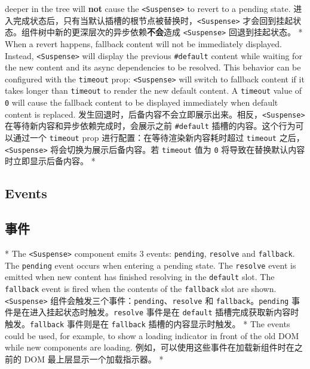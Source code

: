 \begin{paracol}{2}
deeper in the tree will \textbf{not} cause the
\texttt{\textless{}Suspense\textgreater{}} to revert to a pending state.
\switchcolumn
进入完成状态后，只有当默认插槽的根节点被替换时，\texttt{\textless{}Suspense\textgreater{}}
才会回到挂起状态。组件树中新的更深层次的异步依赖\textbf{不会}造成
\texttt{\textless{}Suspense\textgreater{}} 回退到挂起状态。
\switchcolumn[0]*%
When a revert happens, fallback content will not be immediately
displayed. Instead, \texttt{\textless{}Suspense\textgreater{}} will
display the previous \texttt{\#default} content while waiting for the
new content and its async dependencies to be resolved. This behavior can
be configured with the \texttt{timeout} prop:
\texttt{\textless{}Suspense\textgreater{}} will switch to fallback
content if it takes longer than \texttt{timeout} to render the new
default content. A \texttt{timeout} value of \texttt{0} will cause the
fallback content to be displayed immediately when default content is
replaced.
\switchcolumn
发生回退时，后备内容不会立即展示出来。相反，\texttt{\textless{}Suspense\textgreater{}}
在等待新内容和异步依赖完成时，会展示之前 \texttt{\#default}
插槽的内容。这个行为可以通过一个 \texttt{timeout} prop
进行配置：在等待渲染新内容耗时超过 \texttt{timeout}
之后，\texttt{\textless{}Suspense\textgreater{}}
将会切换为展示后备内容。若 \texttt{timeout} 值为 \texttt{0}
将导致在替换默认内容时立即显示后备内容。
\switchcolumn[0]*%
\subsection{Events}
\switchcolumn
\subsection{事件}
\switchcolumn[0]*%
The \texttt{\textless{}Suspense\textgreater{}} component emits 3 events:
\texttt{pending}, \texttt{resolve} and \texttt{fallback}. The
\texttt{pending} event occurs when entering a pending state. The
\texttt{resolve} event is emitted when new content has finished
resolving in the \texttt{default} slot. The \texttt{fallback} event is
fired when the contents of the \texttt{fallback} slot are shown.
\switchcolumn
\texttt{\textless{}Suspense\textgreater{}}
组件会触发三个事件：\texttt{pending}、\texttt{resolve} 和
\texttt{fallback}。\texttt{pending}
事件是在进入挂起状态时触发。\texttt{resolve} 事件是在 \texttt{default}
插槽完成获取新内容时触发。\texttt{fallback} 事件则是在 \texttt{fallback}
插槽的内容显示时触发。
\switchcolumn[0]*%
The events could be used, for example, to show a loading indicator in
front of the old DOM while new components are loading.
\switchcolumn
例如，可以使用这些事件在加载新组件时在之前的 DOM
最上层显示一个加载指示器。
\switchcolumn[0]*%

\end{paracol}
